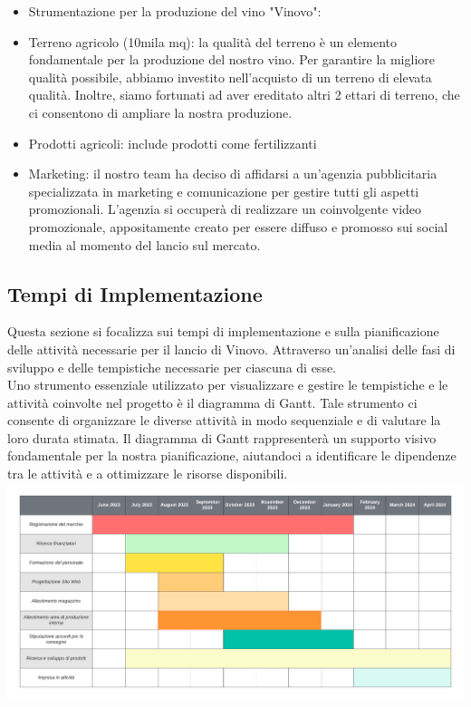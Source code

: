 \documentclass[12pt, a4paper]{article}
\newcommand{\meskip}{\medskip \\}
\begin{document}
\begin{itemize}
    \item Strumentazione per la produzione del vino "Vinovo":
    \item Terreno agricolo (10mila mq): la qualità del terreno è un elemento fondamentale per la produzione del nostro vino. Per garantire la migliore qualità possibile, abbiamo investito nell'acquisto di un terreno di elevata qualità. Inoltre, siamo fortunati ad aver ereditato altri 2 ettari di terreno, che ci consentono di ampliare la nostra produzione.
    \item Prodotti agricoli: include prodotti come fertilizzanti
    \item Marketing: il nostro team ha deciso di affidarsi a un'agenzia pubblicitaria specializzata in marketing e comunicazione per gestire tutti gli aspetti promozionali. L'agenzia si occuperà di realizzare un coinvolgente video promozionale, appositamente creato per essere diffuso e promosso sui social media al momento del lancio sul mercato.
\end{itemize}

\subsection{Tempi di Implementazione}
Questa sezione si focalizza sui tempi di implementazione e sulla pianificazione delle attività necessarie per il lancio di Vinovo. Attraverso un'analisi delle fasi di sviluppo e delle tempistiche necessarie per ciascuna di esse.\meskip
Uno strumento essenziale utilizzato per visualizzare e gestire le tempistiche e le attività coinvolte nel progetto è il diagramma di Gantt. Tale strumento ci consente di organizzare le diverse attività in modo sequenziale e di valutare la loro durata stimata. Il diagramma di Gantt rappresenterà un supporto visivo fondamentale per la nostra pianificazione, aiutandoci a identificare le dipendenze tra le attività e a ottimizzare le risorse disponibili.\meskip
\includegraphics[width=\textwidth]{images/Diagramma_di_Gantt_di_base_1.pdf}
\end{document}
